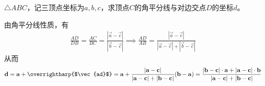 \begin{example}[角平分线]
  $\triangle ABC$，记三顶点坐标为$a,b,c$，求顶点$C$的角平分线与对边交点$D$的坐标$d$。

  由角平分线性质，有
  \begin{align*}
    \frac{AD}{DB}=\frac{AC}{BC}=\frac{\left|\vec a-\vec c\right|}{\left|\vec b-\vec c\right|}
    \implies
    \frac{AD}{AB} = \frac{\left|\vec a-\vec c\right|}{\left|\vec a-\vec c\right| + \left|\vec b-\vec c\right|}
  \end{align*}
  从而
  \begin{align*}
    \vec d={}\vec a + \text{\overrightharp{$\vec{ad}$}} = \vec a + \frac{\left|\vec a-\vec c\right|}{\left|\vec a-\vec c\right| + \left|\vec b-\vec c\right|}(\vec b - \vec a)
    ={} \frac{\left|\vec b-\vec c\right|\cdot \vec a + \left|\vec a-\vec c\right|\cdot \vec b}
              {\left|\vec a-\vec c\right| + \left|\vec b-\vec c\right|}
  \end{align*}
\end{example}

